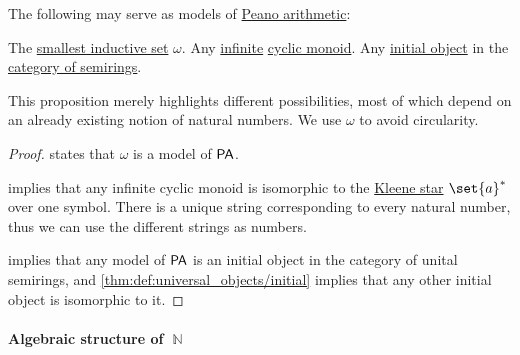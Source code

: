 \begin{proposition}\label{thm:peano_arithmetic_models}
  The following may serve as models of \hyperref[def:peano_arithmetic]{Peano arithmetic}:
  \begin{itemize}
     The \hyperref[thm:smallest_inductive_set_existence]{smallest inductive set} \( \omega \).
     Any \hyperref[def:set_finiteness]{infinite} \hyperref[def:cyclic_monoid]{cyclic monoid}.
     Any \hyperref[def:universal_objects/initial]{initial object} in the \hyperref[def:semiring/category]{category of semirings}.
  \end{itemize}
\end{proposition}
\begin{comments}
  \item This proposition merely highlights different possibilities, most of which depend on an already existing notion of natural numbers. We use \( \omega \) to avoid circularity.
\end{comments}
\begin{proof}
    states that \( \omega \) is a model of \( \textsf{PA} \).

    implies that any infinite cyclic monoid is isomorphic to the \hyperref[def:formal_language/kleene_star]{Kleene star} \( \set{ a }^* \) over one symbol. There is a unique string corresponding to every natural number, thus we can use the different strings as numbers.

    implies that any model of \( \textsf{PA} \) is an initial object in the category of unital semirings, and \cref{thm:def:universal_objects/initial} implies that any other initial object is isomorphic to it.
\end{proof}

\paragraph{Algebraic structure of \( \BbbN \)}

